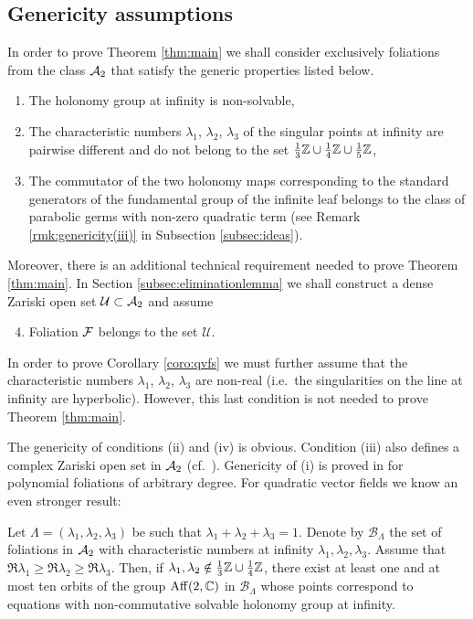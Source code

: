 \documentclass[phd,tocprelim]{cornell}
\begin{document}
\subsection{Genericity assumptions}\label{subsec:genericity}

In order to prove Theorem \ref{thm:main} we shall consider exclusively foliations from the class $\mathcal{A}_2$ that satisfy the generic properties listed below. 
\begin{enumerate}[topsep=0pt,noitemsep,label=(\roman*)]
 \item The holonomy group at infinity is non-solvable,
 \item The characteristic numbers $\lambda_1$, $\lambda_2$, $\lambda_3$ of the singular points at infinity are pairwise different and do not belong to the set $\frac{1}{3}\mathbb{Z}\cup\frac{1}{4}\mathbb{Z}\cup\frac{1}{5}\mathbb{Z}$,
 \item The commutator of the two holonomy maps corresponding to the 
 standard generators
 of the fundamental group of the infinite leaf belongs to the class of parabolic germs with non-zero quadratic term (see Remark \ref{rmk:genericity(iii)} in Subsection \ref{subsec:ideas}).
\end{enumerate}
Moreover, there is an additional technical requirement needed to prove Theorem \ref{thm:main}. In Section \ref{subsec:eliminationlemma} we shall construct a dense Zariski open set $\mathcal{U}\subset\mathcal{A}_2$ and assume
\begin{enumerate}[topsep=0pt,noitemsep,label=(\roman*)]\setcounter{enumi}{3}
 \item Foliation $\mathcal{F}$ belongs to the set $\mathcal{U}$.
\end{enumerate}
In order to prove Corollary \ref{coro:qvfs} we must further assume that the characteristic numbers $\lambda_1$, $\lambda_2$, $\lambda_3$ are non-real (i.e.~the singularities on the line at infinity are hyperbolic). However, this last condition is not needed to prove Theorem \ref{thm:main}.

The genericity of conditions (ii) and (iv) is obvious. Condition (iii) also defines a complex Zariski open set in $\mathcal{A}_2$ (cf.~\cite{Shcherbakov1984}). Genericity of (i) is proved in \cite{Shcherbakov1984} for polynomial foliations of arbitrary degree. For quadratic vector fields we know an even stronger result:

\begin{theorem}
Let $\Lambda=(\lambda_1,\lambda_2,\lambda_3)$ be such that $\lambda_1+\lambda_2+\lambda_3=1$. Denote by $\mathcal{B}_\Lambda$ the set of foliations in $\mathcal{A}_2$ with characteristic numbers at infinity $\lambda_1,\lambda_2,\lambda_3$. Assume that $\Re{\lambda_1}\geq\Re{\lambda_2}\geq\Re{\lambda_3}$. Then, if $\lambda_1,\lambda_2\notin\frac{1}{3}\mathbb{Z}\cup\frac{1}{4}\mathbb{Z}$, there exist at least one and at most ten orbits of the group $\operatorname{Aff}({2},{\mathbb{C}})$ in $\mathcal{B}_\Lambda$ whose points correspond to equations with non-commutative solvable holonomy group at infinity.
\end{theorem}
\end{document}
